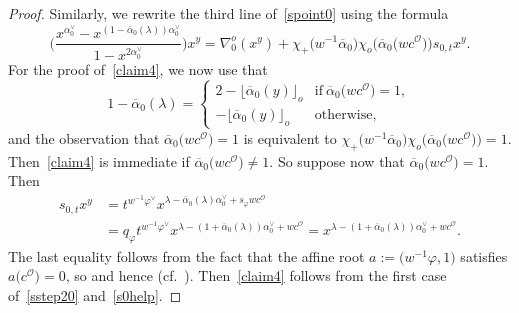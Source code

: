 \documentclass[pdftex]{sigma}
\numberwithin{equation}{section}
\begin{document}
\begin{proof}
Similarly, we rewrite the third line of~\eqref{spoint0} using the formula
\begin{equation}\label{claim4}
\Biggl(\frac{x^{\alpha_0^\vee}-x^{(1-\overline{\alpha}_0(\lambda))\alpha_0^\vee}}{1-x^{2\alpha_0^\vee}}\Biggr)x^y=
\nabla_0^o(x^y)+
\chi_+\bigl(w^{-1}\overline{\alpha}_0\bigr)\chi_o\bigl(\overline{\alpha}_0\bigl(wc^\mathcal{O}\bigr)\bigr)
s_{0,t}x^y.
\end{equation}
For the proof of~\eqref{claim4}, we now use that
\begin{equation}\label{sstep20}
1-\overline{\alpha}_0(\lambda)=
\begin{cases}
2-\lfloor\overline{\alpha}_0(y)\rfloor_o &\text{if}\ \overline{\alpha}_0\bigl(wc^\mathcal{O}\bigr)=1,\\
-\lfloor\overline{\alpha}_0(y)\rfloor_o &\text{otherwise},
\end{cases}
\end{equation}
and the observation that $\overline{\alpha}_0\bigl(wc^\mathcal{O}\bigr)=1$ is equivalent to
$\chi_+\bigl(w^{-1}\overline{\alpha}_0\bigr)\chi_o\bigl(\overline{\alpha}_0\bigl(wc^\mathcal{O}\bigr)\bigr)\!=\!1$. Then~\eqref{claim4} is immediate if $\overline{\alpha}_0\bigl(wc^\mathcal{O}\bigr)\not=1$.
So suppose now that $\overline{\alpha}_0\bigl(wc^\mathcal{O}\bigr)=1$. Then
\begin{align}
s_{0,t}x^y
&=t^{w^{-1}\varphi^\vee}x^{\lambda-\overline{\alpha}_0(\lambda)\alpha_0^\vee+s_\varphi wc^\mathcal{O}}\nonumber\\
&=q_\varphi t^{w^{-1}\varphi^\vee}x^{\lambda-(1+\overline{\alpha}_0(\lambda))\alpha_0^\vee+wc^\mathcal{O}}=
x^{\lambda-(1+\overline{\alpha}_0(\lambda))\alpha_0^\vee+wc^\mathcal{O}}.\label{s0help}
\end{align}
The last equality follows from the fact that the affine root $a:=\bigl(w^{-1}\varphi,1\bigr)$ satisfies $a\bigl(c^\mathcal{O}\bigr)=0$, so  and hence
 (cf.~\cite[Lemma 3.4]{SSV2}). Then~\eqref{claim4} follows from the first case of~\eqref{sstep20} and~\eqref{s0help}.



\end{proof}
\end{document}

